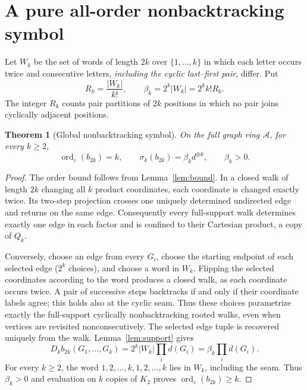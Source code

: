 \documentclass[11pt]{amsart}
\DeclareMathOperator{\ord}{ord}
\newcommand{\eps}{\varepsilon}
\newtheorem{theorem}{Theorem}[section]
\theoremstyle{definition}
\theoremstyle{remark}
\begin{document}
\section{A pure all-order nonbacktracking symbol}
Let $W_k$ be the set of words of length $2k$ over
$\{1,\ldots,k\}$ in which each letter occurs twice and consecutive
letters, \emph{including the cyclic last--first pair}, differ. Put
\begin{equation}\label{eq:beta}
R_k=\frac{|W_k|}{k!},\qquad \beta_k=2^k|W_k|=2^k k!R_k.
\end{equation}
The integer $R_k$ counts pair partitions of $2k$ positions in which no
pair joins cyclically adjacent positions.

\begin{theorem}[Global nonbacktracking symbol]\label{thm:nb}
On the \emph{full} graph ring $\mathcal A$, for every $k\ge2$,
\begin{equation}\label{eq:nb-symbol}
\ord_\eps(b_{2k})=k,\qquad
\sigma_k(b_{2k})=\beta_k d^{\otimes k},\qquad \beta_k>0.
\end{equation}
\end{theorem}
\begin{proof}
The order bound follows from Lemma~\ref{lem:bound}. In a closed walk
of length $2k$ changing all $k$ product coordinates, each coordinate is
changed exactly twice. Its two-step projection crosses one uniquely
determined undirected edge and returns on the same edge. Consequently
every full-support walk determines exactly one edge in each factor and
is confined to their Cartesian product, a copy of $Q_k$.

Conversely, choose an edge from every $G_i$, choose the starting endpoint
of each selected edge ($2^k$ choices), and choose a word in $W_k$.
Flipping the selected coordinates according to the word produces a closed
walk, as each coordinate occurs twice. A pair of successive steps
backtracks if and only if their coordinate labels agree; this holds also
at the cyclic seam. Thus these choices parametrize exactly the
full-support cyclically nonbacktracking rooted walks, even when vertices
are revisited nonconsecutively. The selected edge tuple is recovered
uniquely from the walk. Lemma~\ref{lem:support} gives
\[
D_kb_{2k}(G_1,\ldots,G_k)
=2^k |W_k|\prod_i d(G_i)=\beta_k\prod_i d(G_i).
\]
For every $k\ge2$, the word
$1,2,\ldots,k,1,2,\ldots,k$ lies in $W_k$, including the seam.
Thus $\beta_k>0$ and evaluation on $k$ copies of $K_2$ proves
$\ord_\eps(b_{2k})\ge k$.
\end{proof}
\end{document}
